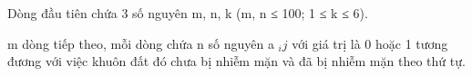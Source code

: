 Dòng đầu tiên chứa 3 số nguyên m, n, k (m, n ≤ 100; 1 ≤ k ≤ 6).  

   m dòng tiếp theo, mỗi dòng chứa n số nguyên a   $_    ij   $   với giá trị là 0 hoặc 1 tương đương với việc khuôn đất đó chưa bị nhiễm mặn và đã bị nhiễm mặn theo thứ tự.